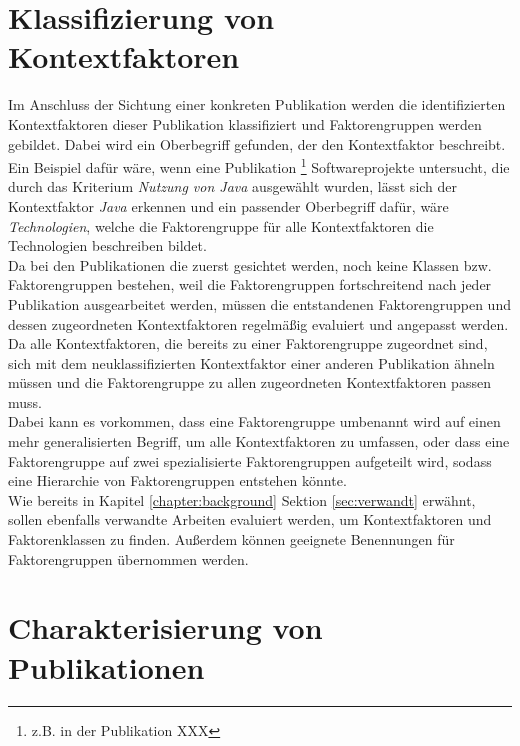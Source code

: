 \section{Klassifizierung von Kontextfaktoren}
\label{sec:class-context}
Im Anschluss der Sichtung einer konkreten Publikation werden die identifizierten Kontextfaktoren dieser Publikation klassifiziert und Faktorengruppen werden gebildet. Dabei wird ein Oberbegriff gefunden, der den Kontextfaktor beschreibt. Ein Beispiel dafür wäre, wenn eine Publikation \footnote{z.B. in der Publikation XXX} Softwareprojekte untersucht, die durch das Kriterium \textit{Nutzung von Java} ausgewählt wurden, lässt sich der Kontextfaktor \textit{Java} erkennen und ein passender Oberbegriff dafür, wäre \textit{Technologien}, welche die Faktorengruppe für alle Kontextfaktoren die Technologien beschreiben bildet. \\

Da bei den Publikationen die zuerst gesichtet werden, noch keine Klassen bzw. Faktorengruppen bestehen, weil die Faktorengruppen fortschreitend nach jeder Publikation ausgearbeitet werden, müssen die entstandenen Faktorengruppen und dessen zugeordneten Kontextfaktoren regelmäßig evaluiert und angepasst werden. Da alle Kontextfaktoren, die bereits zu einer Faktorengruppe zugeordnet sind, sich mit dem neuklassifizierten Kontextfaktor einer anderen Publikation ähneln müssen und die Faktorengruppe zu allen zugeordneten Kontextfaktoren passen muss. \\
Dabei kann es vorkommen, dass eine Faktorengruppe umbenannt wird auf einen mehr generalisierten Begriff, um alle Kontextfaktoren zu umfassen, oder dass eine Faktorengruppe auf zwei spezialisierte Faktorengruppen aufgeteilt wird, sodass eine Hierarchie von Faktorengruppen entstehen könnte. \\


Wie bereits in Kapitel \ref{chapter:background} Sektion \ref{sec:verwandt} erwähnt, sollen ebenfalls verwandte Arbeiten evaluiert werden, um Kontextfaktoren und Faktorenklassen zu finden. Außerdem können geeignete Benennungen für Faktorengruppen  übernommen werden.


\section{Charakterisierung von Publikationen}
\label{sec:character}

